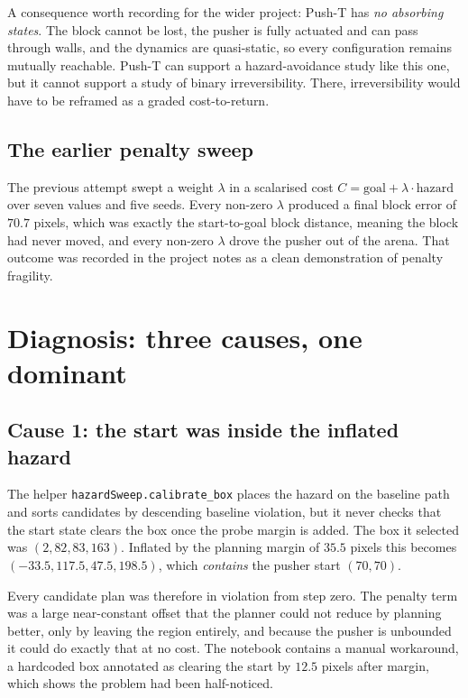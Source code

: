 \documentclass[11pt,a4paper]{article}
\begin{document}
A consequence worth recording for the wider project: Push-T has \emph{no absorbing states}.
The block cannot be lost, the pusher is fully actuated and can pass through walls, and the
dynamics are quasi-static, so every configuration remains mutually reachable. Push-T can
support a hazard-avoidance study like this one, but it cannot support a study of binary
irreversibility. There, irreversibility would have to be reframed as a graded cost-to-return.

\subsection{The earlier penalty sweep}

The previous attempt swept a weight $\lambda$ in a scalarised cost
$C = \text{goal} + \lambda \cdot \text{hazard}$ over seven values and five seeds. Every
non-zero $\lambda$ produced a final block error of $70.7$ pixels, which was exactly the
start-to-goal block distance, meaning the block had never moved, and every non-zero $\lambda$
drove the pusher out of the arena. That outcome was recorded in the project notes as a clean
demonstration of penalty fragility.

\section{Diagnosis: three causes, one dominant}

\subsection{Cause 1: the start was inside the inflated hazard}

The helper \texttt{hazardSweep.calibrate\_box} places the hazard on the baseline path and
sorts candidates by descending baseline violation, but it never checks that the start state
clears the box once the probe margin is added. The box it selected was
$(2, 82, 83, 163)$. Inflated by the planning margin of $35.5$ pixels this becomes
$(-33.5, 117.5, 47.5, 198.5)$, which \emph{contains} the pusher start $(70, 70)$.

Every candidate plan was therefore in violation from step zero. The penalty term was a large
near-constant offset that the planner could not reduce by planning better, only by leaving the
region entirely, and because the pusher is unbounded it could do exactly that at no cost. The
notebook contains a manual workaround, a hardcoded box annotated as clearing the start by
$12.5$ pixels after margin, which shows the problem had been half-noticed.
\end{document}
